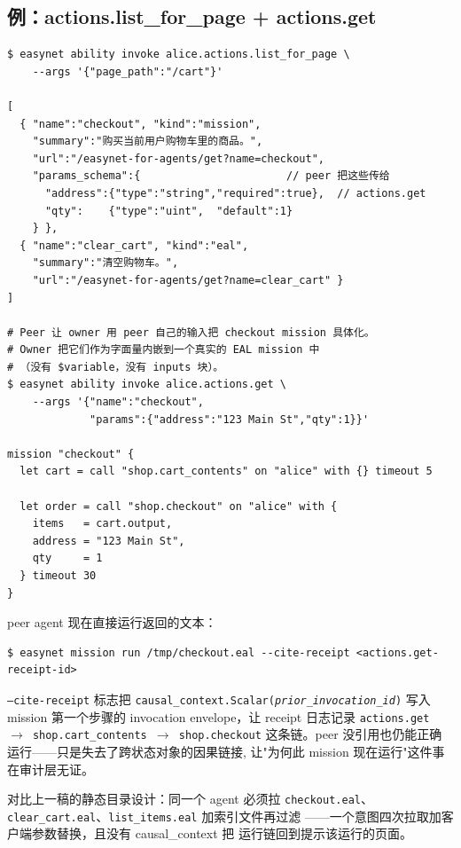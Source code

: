 \documentclass[11pt,a4paper]{article}
\theoremstyle{definition}
\begin{document}
\subsection{例：actions.list\_for\_page + actions.get}

\begin{lstlisting}
$ easynet ability invoke alice.actions.list_for_page \
    --args '{"page_path":"/cart"}'

[
  { "name":"checkout", "kind":"mission",
    "summary":"购买当前用户购物车里的商品。",
    "url":"/easynet-for-agents/get?name=checkout",
    "params_schema":{                       // peer 把这些传给
      "address":{"type":"string","required":true},  // actions.get
      "qty":    {"type":"uint",  "default":1}
    } },
  { "name":"clear_cart", "kind":"eal",
    "summary":"清空购物车。",
    "url":"/easynet-for-agents/get?name=clear_cart" }
]

# Peer 让 owner 用 peer 自己的输入把 checkout mission 具体化。
# Owner 把它们作为字面量内嵌到一个真实的 EAL mission 中
# （没有 $variable，没有 inputs 块）。
$ easynet ability invoke alice.actions.get \
    --args '{"name":"checkout",
             "params":{"address":"123 Main St","qty":1}}'

mission "checkout" {
  let cart = call "shop.cart_contents" on "alice" with {} timeout 5

  let order = call "shop.checkout" on "alice" with {
    items   = cart.output,
    address = "123 Main St",
    qty     = 1
  } timeout 30
}
\end{lstlisting}

peer agent 现在直接运行返回的文本：

\begin{lstlisting}
$ easynet mission run /tmp/checkout.eal --cite-receipt <actions.get-receipt-id>
\end{lstlisting}

\noindent \texttt{--cite-receipt} 标志把
\texttt{causal\_context.Scalar(\textit{prior\_invocation\_id})} 写入
mission 第一个步骤的 invocation envelope，让 receipt 日志记录
\texttt{actions.get $\to$ shop.cart\_contents $\to$ shop.checkout}
这条链。peer 没引用也仍能正确运行——只是失去了跨状态对象的因果链接,
让"为何此 mission 现在运行"这件事在审计层无证。

对比上一稿的静态目录设计：同一个 agent 必须拉 \texttt{checkout.eal}、
\texttt{clear\_cart.eal}、\texttt{list\_items.eal} 加索引文件再过滤
——一个意图四次拉取加客户端参数替换，且没有 causal\_context 把
运行链回到提示该运行的页面。
\end{document}
